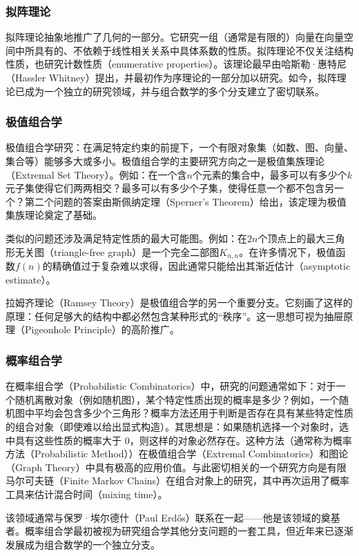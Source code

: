 \subsubsection{拟阵理论}
拟阵理论抽象地推广了几何的一部分。它研究一组（通常是有限的）向量在向量空间中所具有的、不依赖于线性相关关系中具体系数的性质。拟阵理论不仅关注结构性质，也研究计数性质（enumerative properties）。该理论最早由哈斯勒·惠特尼（Hassler Whitney）提出，并最初作为序理论的一部分加以研究。如今，拟阵理论已成为一个独立的研究领域，并与组合数学的多个分支建立了密切联系。
\subsubsection{极值组合学}
极值组合学研究：在满足特定约束的前提下，一个有限对象集（如数、图、向量、集合等）能够多大或多小。极值组合学的主要研究方向之一是极值集族理论（Extremal Set Theory）。例如：在一个含$n$个元素的集合中，最多可以有多少个$k$元子集使得它们两两相交？最多可以有多少个子集，使得任意一个都不包含另一个？第二个问题的答案由斯佩纳定理（Sperner’s Theorem）给出，该定理为极值集族理论奠定了基础。

类似的问题还涉及满足特定性质的最大可能图。例如：在$2n$个顶点上的最大三角形无关图（triangle-free graph）是一个完全二部图$K_{n,n}$。在许多情况下，极值函数$f(n)$的精确值过于复杂难以求得，因此通常只能给出其渐近估计（asymptotic estimate）。

拉姆齐理论（Ramsey Theory）是极值组合学的另一个重要分支。它刻画了这样的原理：任何足够大的结构中都必然包含某种形式的“秩序”。这一思想可视为抽屉原理（Pigeonhole Principle）的高阶推广。
\subsubsection{概率组合学}

在概率组合学（Probabilistic Combinatorics）中，研究的问题通常如下：对于一个随机离散对象（例如随机图），某个特定性质出现的概率是多少？例如，一个随机图中平均会包含多少个三角形？概率方法还用于判断是否存在具有某些特定性质的组合对象（即使难以给出显式构造）。其思想是：如果随机选择一个对象时，选中具有这些性质的概率大于 0，则这样的对象必然存在。这种方法（通常称为概率方法（Probabilistic Method））在极值组合学（Extremal Combinatorics）和图论（Graph Theory）中具有极高的应用价值。与此密切相关的一个研究方向是有限马尔可夫链（Finite Markov Chains）在组合对象上的研究，其中再次运用了概率工具来估计混合时间（mixing time）。  

该领域通常与保罗·埃尔德什（Paul Erdős）联系在一起——他是该领域的奠基者。概率组合学最初被视为研究组合学其他分支问题的一套工具，但近年来已逐渐发展成为组合数学的一个独立分支。




